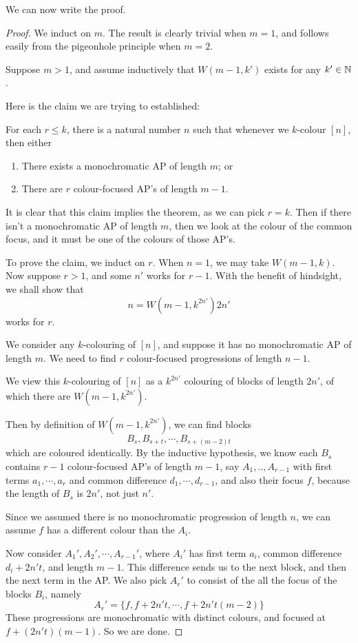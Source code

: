 \documentclass[a4paper]{article}
\begin{document}
We can now write the proof.
\begin{proof}
  We induct on $m$. The result is clearly trivial when $m = 1$, and follows easily from the pigeonhole principle when $m = 2$.

  Suppose $m > 1$, and assume inductively that $W(m - 1, k')$ exists for any $k' \in \mathbb{N}$.

  Here is the claim we are trying to established:
  \begin{claim}
    For each $r \leq k$, there is a natural number $n$ such that whenever we $k$-colour $[n]$, then either
    \begin{enumerate}
    \item There exists a monochromatic AP of length $m$; or
    \item There are $r$ colour-focused AP's of length $m - 1$.
    \end{enumerate}
  \end{claim}
  It is clear that this claim implies the theorem, as we can pick $r = k$. Then if there isn't a monochromatic AP of length $m$, then we look at the colour of the common focus, and it must be one of the colours of those AP's.

  To prove the claim, we induct on $r$. When $n = 1$, we may take $W(m - 1, k)$. Now suppose $r > 1$, and some $n'$ works for $r - 1$. With the benefit of hindsight, we shall show that
  \[
    n = W(m - 1, k^{2n'}) 2n'
  \]
  works for $r$.

  We consider any $k$-colouring of $[n]$, and suppose it has no monochromatic AP of length $m$. We need to find $r$ colour-focused progressions of length $n - 1$.

  We view this $k$-colouring of $[n]$ as a $k^{2n'}$ colouring of blocks of length $2n'$, of which there are $W(m - 1, k^{2n'})$.

  Then by definition of $W(m - 1, k^{2n'})$, we can find blocks
  \[
    B_s, B_{s + t}, \cdots, B_{s + (m - 2)t}
  \]
  which are coloured identically. By the inductive hypothesis, we know each $B_s$ contains $r - 1$ colour-focused AP's of length $m - 1$, say $A_1, .., A_{r - 1}$ with first terms $a_1, \cdots, a_r$ and common difference $d_1 , \cdots, d_{r - 1}$, and also their focus $f$, because the length of $B_s$ is $2n'$, not just $n'$.

  Since we assumed there is no monochromatic progression of length $n$, we can assume $f$ has a different colour than the $A_i$.

  Now consider $A_1', A_2', \cdots, A_{r - 1}'$, where $A_i'$ has first term $a_i$, common difference $d_i + 2n't$, and length $m - 1$. This difference sends us to the next block, and then the next term in the AP. We also pick $A_r'$ to consist of the all the focus of the blocks $B_i$, namely
  \[
    A_r' = \{f, f + 2n't, \cdots, f + 2n't(m - 2)\}
  \]
  These progressions are monochromatic with distinct colours, and focused at $f + (2n' t)(m - 1)$. So we are done.
\end{proof}
\end{document}
